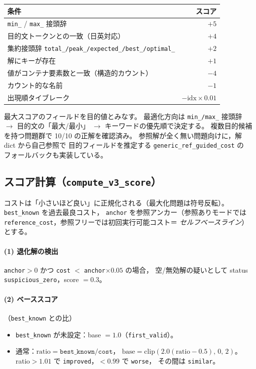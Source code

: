 \documentclass[uplatex,dvipdfmx,a4paper,11pt]{jsarticle}
\begin{document}
\begin{center}
\begin{tabular}{lr}
  \toprule
  条件 & スコア \\
  \midrule
  \texttt{min\_} / \texttt{max\_} 接頭辞 & $+5$ \\
  目的文トークンとの一致（日英対応） & $+4$ \\
  集約接頭辞 \texttt{total\_/peak\_/expected\_/best\_/optimal\_} & $+2$ \\
  解にキーが存在 & $+1$ \\
  値がコンテナ要素数と一致（構造的カウント） & $-4$ \\
  カウント的な名前 & $-1$ \\
  出現順タイブレーク & $-\text{idx}\times 0.01$ \\
  \bottomrule
\end{tabular}
\end{center}

最大スコアのフィールドを目的値とみなす。
最適化方向は \texttt{min\_/max\_} 接頭辞 $\to$ 目的文の「最大/最小」
$\to$ キーワードの優先順で決定する。
複数目的候補を持つ問題群で 10/10 の正解を確認済み。
参照解が全く無い問題向けに，解 dict から自己参照で
目的フィールドを推定する \texttt{generic\_ref\_guided\_cost} の
フォールバックも実装している。

\subsection{スコア計算（\texttt{compute\_v3\_score}）}\label{sec:score}

コストは「小さいほど良い」に正規化される（最大化問題は符号反転）。
\texttt{best\_known} を過去最良コスト，
\texttt{anchor} を参照アンカー（参照ありモードでは
\texttt{reference\_cost}，参照フリーでは初回実行可能コスト＝
\emph{セルフベースライン}）とする。

\paragraph{(1) 退化解の検出}
\texttt{anchor}$>0$ かつ
\texttt{cost} $<$ \texttt{anchor}$\times 0.05$ の場合，
空/無効解の疑いとして status \texttt{suspicious\_zero}，score $=0.3$。

\paragraph{(2) ベーススコア}（\texttt{best\_known} との比）
\begin{itemize}
  \item \texttt{best\_known} が未設定：base $=1.0$（\texttt{first\_valid}）。
  \item 通常：$\text{ratio}=\texttt{best\_known}/\texttt{cost}$，
    $\text{base}=\mathrm{clip}(2.0(\text{ratio}-0.5),\,0,\,2)$。
    ratio$>1.01$ で \texttt{improved}，$<0.99$ で \texttt{worse}，
    その間は \texttt{similar}。
\end{itemize}
\end{document}
